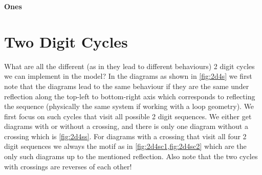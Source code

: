 \documentclass[11pt]{article}
\begin{document}
\begin{center}
    \LARGE
    \textbf{Ones}
    \vspace{1em}
\end{center}

\section{Two Digit Cycles}
What are all the different (as in they lead to different behaviours) 2 digit cycles we can implement in the model?
In the diagrams as shown in \cref{fig:2d4s} we first note that the diagrams lead to the same behaviour if they are the same under reflection along the top-left to bottom-right axis which corresponds to reflecting the sequence (physically the same system if working with a loop geometry).
We first focus on such cycles that visit all possible 2 digit sequences.
We either get diagrams with or without a crossing, and there is only one diagram without a crossing which is \cref{fig:2d4ss}.
For diagrams with a crossing that visit all four 2 digit sequences we always the motif as in \cref{fig:2d4sc1,fig:2d4sc2} which are the only such diagrams up to the mentioned reflection.
Also note that the two cycles with crossings are reverses of each other!
\end{document}
